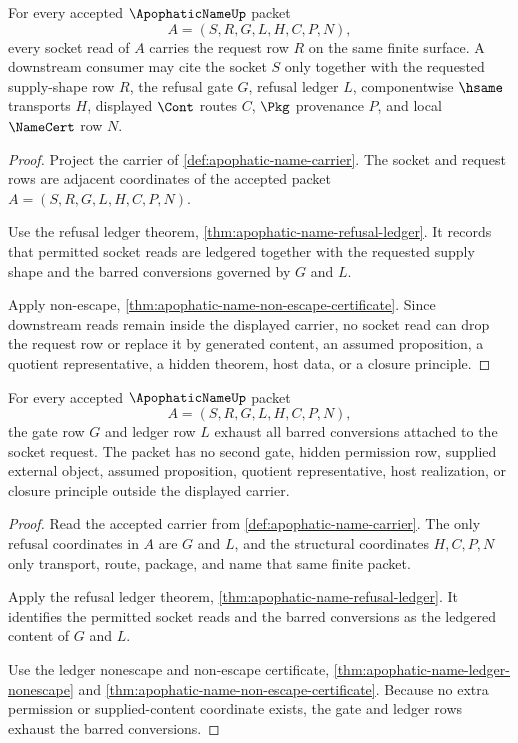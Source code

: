 \begin{theorem}
\label{thm:apophatic-name-socket-request-totality}
For every accepted $\ApophaticNameUp$ packet
$$
A=(S,R,G,L,H,C,P,N),
$$
every socket read of $A$ carries the request row $R$ on the same finite surface. A downstream consumer may cite the socket $S$ only together with the requested supply-shape row $R$, the refusal gate $G$, refusal ledger $L$, componentwise $\hsame$ transports $H$, displayed $\Cont$ routes $C$, $\Pkg$ provenance $P$, and local $\NameCert$ row $N$.
\end{theorem}
\begin{proof}
Project the carrier of \autoref{def:apophatic-name-carrier}. The socket and request rows are adjacent coordinates of the accepted packet $A=(S,R,G,L,H,C,P,N)$.

Use the refusal ledger theorem, \autoref{thm:apophatic-name-refusal-ledger}. It records that permitted socket reads are ledgered together with the requested supply shape and the barred conversions governed by $G$ and $L$.

Apply non-escape, \autoref{thm:apophatic-name-non-escape-certificate}. Since downstream reads remain inside the displayed carrier, no socket read can drop the request row or replace it by generated content, an assumed proposition, a quotient representative, a hidden theorem, host data, or a closure principle.
\end{proof}

\begin{theorem}
\label{thm:apophatic-name-gate-ledger-exactness}
For every accepted $\ApophaticNameUp$ packet
$$
A=(S,R,G,L,H,C,P,N),
$$
the gate row $G$ and ledger row $L$ exhaust all barred conversions attached to the socket request. The packet has no second gate, hidden permission row, supplied external object, assumed proposition, quotient representative, host realization, or closure principle outside the displayed carrier.
\end{theorem}
\begin{proof}
Read the accepted carrier from \autoref{def:apophatic-name-carrier}. The only refusal coordinates in $A$ are $G$ and $L$, and the structural coordinates $H,C,P,N$ only transport, route, package, and name that same finite packet.

Apply the refusal ledger theorem, \autoref{thm:apophatic-name-refusal-ledger}. It identifies the permitted socket reads and the barred conversions as the ledgered content of $G$ and $L$.

Use the ledger nonescape and non-escape certificate, \autoref{thm:apophatic-name-ledger-nonescape} and \autoref{thm:apophatic-name-non-escape-certificate}. Because no extra permission or supplied-content coordinate exists, the gate and ledger rows exhaust the barred conversions.
\end{proof}

